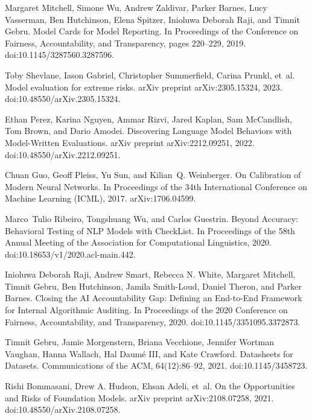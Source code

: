 \documentclass[11pt]{article}
\begin{document}
\begin{thebibliography}{99}
Margaret Mitchell, Simone Wu, Andrew Zaldivar, Parker Barnes, Lucy Vasserman, Ben Hutchinson, Elena Spitzer, Inioluwa Deborah Raji, and Timnit Gebru.
\newblock Model Cards for Model Reporting.
\newblock In Proceedings of the Conference on Fairness, Accountability, and Transparency, pages 220--229, 2019.
\newblock doi:10.1145/3287560.3287596.

Toby Shevlane, Iason Gabriel, Christopher Summerfield, Carina Prunkl, et~al.
\newblock Model evaluation for extreme risks.
\newblock arXiv preprint arXiv:2305.15324, 2023.
\newblock doi:10.48550/arXiv.2305.15324.

Ethan Perez, Karina Nguyen, Ammar Rizvi, Jared Kaplan, Sam McCandlish, Tom Brown, and Dario Amodei.
\newblock Discovering Language Model Behaviors with Model-Written Evaluations.
\newblock arXiv preprint arXiv:2212.09251, 2022.
\newblock doi:10.48550/arXiv.2212.09251.

Chuan Guo, Geoff Pleiss, Yu Sun, and Kilian~Q. Weinberger.
\newblock On Calibration of Modern Neural Networks.
\newblock In Proceedings of the 34th International Conference on Machine Learning (ICML), 2017.
\newblock arXiv:1706.04599.

Marco~Tulio Ribeiro, Tongshuang Wu, and Carlos Guestrin.
\newblock Beyond Accuracy: Behavioral Testing of NLP Models with CheckList.
\newblock In Proceedings of the 58th Annual Meeting of the Association for Computational Linguistics, 2020.
\newblock doi:10.18653/v1/2020.acl-main.442.

Inioluwa Deborah Raji, Andrew Smart, Rebecca N. White, Margaret Mitchell, Timnit Gebru, Ben Hutchinson, Jamila Smith-Loud, Daniel Theron, and Parker Barnes.
\newblock Closing the AI Accountability Gap: Defining an End-to-End Framework for Internal Algorithmic Auditing.
\newblock In Proceedings of the 2020 Conference on Fairness, Accountability, and Transparency, 2020.
\newblock doi:10.1145/3351095.3372873.

Timnit Gebru, Jamie Morgenstern, Briana Vecchione, Jennifer Wortman Vaughan, Hanna Wallach, Hal Daumé III, and Kate Crawford.
\newblock Datasheets for Datasets.
\newblock Communications of the ACM, 64(12):86–92, 2021.
\newblock doi:10.1145/3458723.

Rishi Bommasani, Drew A. Hudson, Ehsan Adeli, et~al.
\newblock On the Opportunities and Risks of Foundation Models.
\newblock arXiv preprint arXiv:2108.07258, 2021.
\newblock doi:10.48550/arXiv.2108.07258.

\end{thebibliography}
\end{document}
